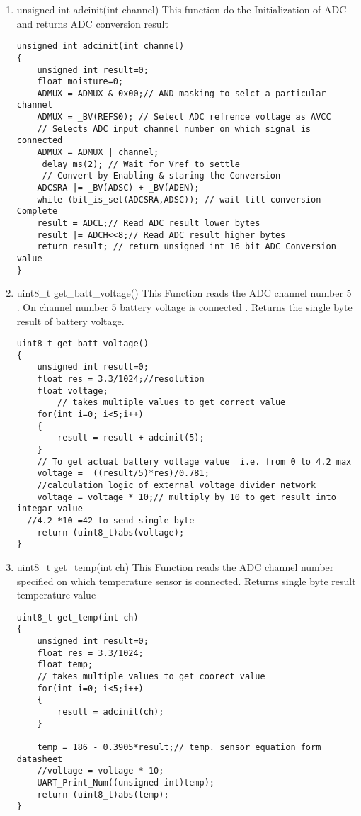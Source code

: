 \documentclass{article}
\begin{document}
\begin{itemize}
\begin{enumerate}
\item unsigned int adcinit(int channel)
\newline This function do the Initialization of ADC and returns ADC conversion result
\begin{lstlisting}
unsigned int adcinit(int channel)
{
	unsigned int result=0;
	float moisture=0;
	ADMUX = ADMUX & 0x00;// AND masking to selct a particular channel
	ADMUX = _BV(REFS0); // Select ADC refrence voltage as AVCC
    // Selects ADC input channel number on which signal is connected
	ADMUX = ADMUX | channel; 
	_delay_ms(2); // Wait for Vref to settle
     // Convert by Enabling & staring the Conversion 
	ADCSRA |= _BV(ADSC) + _BV(ADEN);
	while (bit_is_set(ADCSRA,ADSC)); // wait till conversion Complete
	result = ADCL;// Read ADC result lower bytes
	result |= ADCH<<8;// Read ADC result higher bytes
	return result; // return unsigned int 16 bit ADC Conversion value	
}
\end{lstlisting}
\item uint8\_t get\_batt\_voltage()
\newline This Function reads the ADC channel number 5 .
\newline On channel number 5 battery voltage is connected . Returns the single byte result of battery voltage.
\begin{lstlisting}
uint8_t get_batt_voltage()
{
	unsigned int result=0;
	float res = 3.3/1024;//resolution
	float voltage;
        // takes multiple values to get correct value
	for(int i=0; i<5;i++)
	{
		result = result + adcinit(5);
	}
	// To get actual battery voltage value  i.e. from 0 to 4.2 max
	voltage =  ((result/5)*res)/0.781;
    //calculation logic of external voltage divider network
	voltage = voltage * 10;// multiply by 10 to get result into integar value 
  //4.2 *10 =42 to send single byte
	return (uint8_t)abs(voltage);	
}
\end{lstlisting}

\item uint8\_t get\_temp(int ch)
\newline This Function reads the ADC channel number specified on which temperature sensor is connected.
\newline Returns single byte result temperature value
\begin{lstlisting}
uint8_t get_temp(int ch)
{
	unsigned int result=0;
	float res = 3.3/1024;
	float temp;
    // takes multiple values to get coorect value
	for(int i=0; i<5;i++)
	{
		result = adcinit(ch);
	}

	temp = 186 - 0.3905*result;// temp. sensor equation form datasheet
	//voltage = voltage * 10;
	UART_Print_Num((unsigned int)temp);
	return (uint8_t)abs(temp);
}
\end{lstlisting}


\end{enumerate}
\end{itemize}
\end{document}
